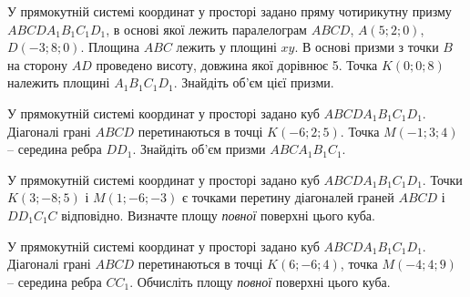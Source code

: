 \documentclass[12pt]{article}
\begin{document}
\begin{samepage}
\noindent\zadnum У прямокутній системі координат у просторі задано пряму чотирикутну призму $ABCDA_1B_1C_1D_1$, в основі якої лежить паралелограм $ABCD$, $A(5; 2; 0)$, $D(-3; 8; 0)$. Площина $ABC$ лежить у площині $xy$. В основі призми з точки $B$ на сторону $AD$ проведено висоту, довжина якої дорівнює 5. Точка $K(0; 0; 8)$ належить площині $A_1B_1C_1D_1$. Знайдіть об’єм цієї призми. 

\nmtnobreak
\nopagebreak\nbvspace{0.5cm}
\nmtAnswerBox
\par{}
\end{samepage}

\begin{samepage}
\noindent\zadnum У прямокутній системі координат у просторі задано куб $ABCDA_1B_1C_1D_1$. Діагоналі грані $ABCD$ перетинаються в точці $K(-6; 2; 5)$. Точка $M(-1; 3; 4)$ – середина ребра $DD_1$. Знайдіть об’єм призми $ABCA_1B_1C_1$. 

\nmtnobreak
\nopagebreak\nbvspace{0.5cm}
\nmtAnswerBox
\par{}
\end{samepage}

\begin{samepage}
\noindent\zadnum У прямокутній системі координат у просторі задано куб $ABCDA_1B_1C_1D_1$. Точки $K(3; -8; 5)$ і $M(1; -6; -3)$ є точками перетину діагоналей граней $ABCD$ і $DD_1C_1C$ відповідно. Визначте площу \textit{повної} поверхні цього куба. 

\nmtnobreak
\nopagebreak\nbvspace{0.5cm}
\nmtAnswerBox
\par{}
\end{samepage}

\begin{samepage}
\noindent\zadnum У прямокутній системі координат у просторі задано куб $ABCDA_1B_1C_1D_1$. Діагоналі грані $ABCD$ перетинаються в точці $K(6; -6; 4)$, точка $M(-4; 4; 9)$ – середина ребра $CC_1$. Обчисліть площу \textit{повної} поверхні цього куба. 

\nmtnobreak
\nopagebreak\nbvspace{0.5cm}
\nmtAnswerBox
\par{}
\end{samepage}
\end{document}
